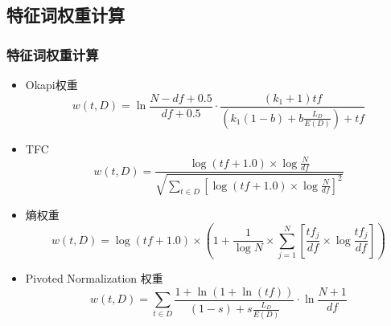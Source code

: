 \documentclass[CJKutf8, table]{beamer}
\begin{document}
\begin{CJK}{UTF8}{gbsn}
\begin{frame}[fragile]
\end{frame}

\subsection{特征词权重计算}
\begin{frame}
  \frametitle{特征词权重计算}
  \begin{tiny}
    \begin{block}{}
      \begin{itemize}
        \item<1- | alert@1>{Okapi权重\cite{Robertson}
          $$
          w(t, D) = \ln \frac{N-df+0.5}{df + 0.5}\cdot
          \frac{(k_1 + 1) tf}{(k_1(1-b)+b\frac{L_D}{E(D)})+tf}
          $$}
        \item<2- | alert@2>{TFC
          $$
          w(t, D) = \frac{\log (tf + 1.0) \times \log \frac{N}{df}}{\sqrt{\sum_{t \in
          D}\left[\log (tf + 1.0) \times \log \frac{N}{df}\right]^2}}
          $$}
        \item<3- | alert@3>{熵权重
          $$
          w(t, D) = \log (tf + 1.0) \times \left (1 + \frac{1}{\log N} \times
          \sum_{j = 1}^N\left [\frac{tf_j}{df} \times \log
          \frac{tf_j}{df}\right]\right)
          $$}
        \item<4- | alert@4>{Pivoted Normalization 权重\cite{Singhal}
          $$
          w(t, D) = \sum_{t\in D} \frac{1 + \ln (1+ \ln(tf))}{(1-s)+s
          \frac{L_D}{E(D)}}\cdot \ln \frac{N+1}{df}
          $$}
        \end{itemize}
    \end{block}
  \end{tiny}
\end{frame}


\end{CJK}
\end{document}
